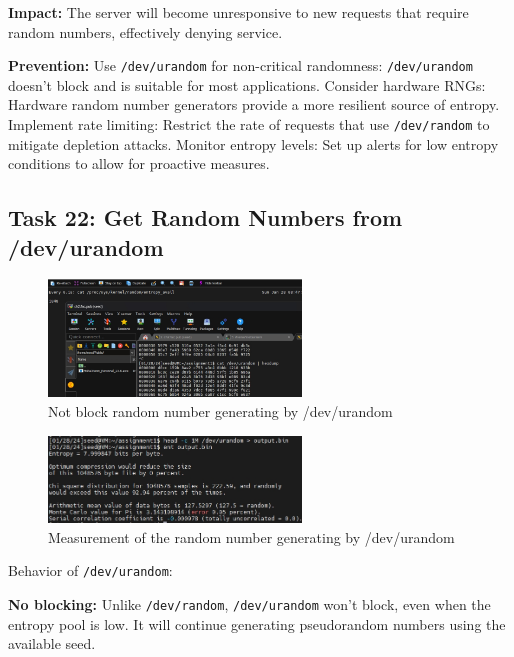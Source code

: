 \documentclass[a4paper]{article}
\begin{document}
\textbf{Impact:}
The server will become unresponsive to new requests that require random numbers, effectively denying service.

\textbf{Prevention:}
Use \verb|/dev/urandom| for non-critical randomness: \verb|/dev/urandom| doesn't block and is suitable for most applications.
Consider hardware RNGs: Hardware random number generators provide a more resilient source of entropy.
Implement rate limiting: Restrict the rate of requests that use \verb|/dev/random| to mitigate depletion attacks.
Monitor entropy levels: Set up alerts for low entropy conditions to allow for proactive measures.

\subsection{Task 22: Get Random Numbers from /dev/urandom}

\begin{figure}[h]
    \centering
       \includegraphics[width=0.6\textwidth]{figures/task22/watch1.png}
    \caption{Not block random number generating by /dev/urandom}\label{fig:task22observation-1}
\end{figure}

\begin{figure}[h]
    \centering
       \includegraphics[width=0.6\textwidth]{figures/task22/watch2.png}
    \caption{Measurement of the random number generating by /dev/urandom}\label{fig:task22observation-2}
\end{figure}

Behavior of \verb|/dev/urandom|:

\textbf{No blocking:} Unlike \verb|/dev/random|, \verb|/dev/urandom| won't block, even when the entropy pool is low. It will continue generating pseudorandom numbers using the available seed.
\end{document}
